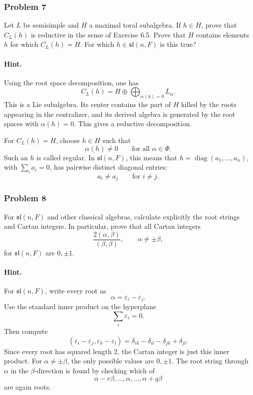 \documentclass[12pt, a4paper]{article}
\begin{document}
\subsubsection{Problem 7}

Let \(L\) be semisimple and \(H\) a maximal toral subalgebra. If \(h\in H\),
prove that \(C_L(h)\) is reductive in the sense of Exercise 6.5. Prove that
\(H\) contains elements \(h\) for which \(C_L(h)=H\). For which \(h\in
\mathfrak{sl}(n,F)\) is this true?

\paragraph{Hint.}
Using the root space decomposition, one has
\[
C_L(h)
=
H\oplus \bigoplus_{\alpha(h)=0} L_\alpha.
\]
This is a Lie subalgebra. Its center contains the part of \(H\) killed by the
roots appearing in the centralizer, and its derived algebra is generated by
the root spaces with \(\alpha(h)=0\). This gives a reductive decomposition.

For \(C_L(h)=H\), choose \(h\in H\) such that
\[
\alpha(h)\neq 0
\qquad \text{for all } \alpha\in\Phi.
\]
Such an \(h\) is called regular. In \(\mathfrak{sl}(n,F)\), this means that
\(h=\operatorname{diag}(a_1,\ldots,a_n)\), with \(\sum_i a_i=0\), has pairwise
distinct diagonal entries:
\[
a_i\neq a_j
\qquad \text{for } i\neq j.
\]

\subsubsection{Problem 8}

For \(\mathfrak{sl}(n,F)\) and other classical algebras, calculate explicitly
the root strings and Cartan integers. In particular, prove that all Cartan
integers
\[
\frac{2(\alpha,\beta)}{(\beta,\beta)},
\qquad \alpha\neq \pm\beta,
\]
for \(\mathfrak{sl}(n,F)\) are \(0,\pm 1\).

\paragraph{Hint.}
For \(\mathfrak{sl}(n,F)\), write every root as
\[
\alpha=\varepsilon_i-\varepsilon_j.
\]
Use the standard inner product on the hyperplane
\[
\sum_i \varepsilon_i=0.
\]
Then compute
\[
(\varepsilon_i-\varepsilon_j,\varepsilon_k-\varepsilon_l)
=
\delta_{ik}-\delta_{il}-\delta_{jk}+\delta_{jl}.
\]
Since every root has squared length \(2\), the Cartan integer is just this
inner product. For \(\alpha\neq \pm \beta\), the only possible values are
\(0,\pm 1\). The root string through \(\alpha\) in the \(\beta\)-direction is
found by checking which of
\[
\alpha-r\beta,\ldots,\alpha,\ldots,\alpha+q\beta
\]
are again roots.
\end{document}

